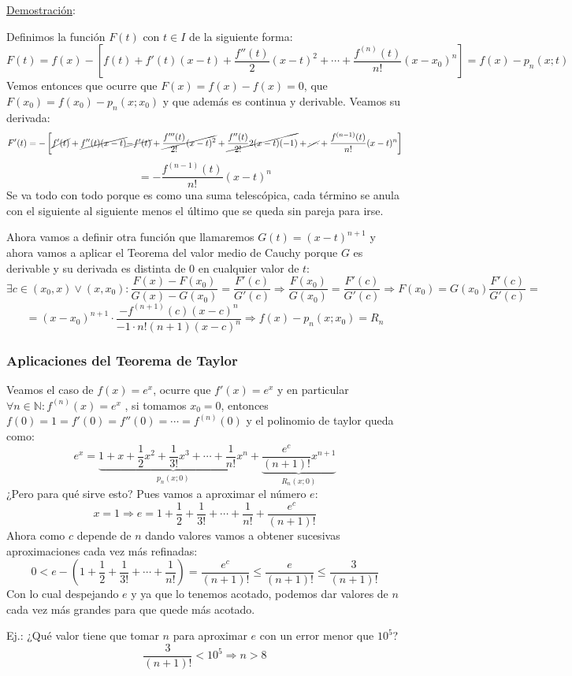 \documentclass[10pt,a4paper,openright]{book}
\begin{document}
\underline{Demostración}:

Definimos la función $F(t)$ con $t\in I$ de la siguiente forma:
$$F(t)=f(x)-\left[f(t)+f'(t)(x-t)+\frac{f''(t)}{2}(x-t)^2+\cdots + \frac{f^{(n)}(t)}{n!}(x-x_0)^n\right]=f(x)-p_n(x;t)$$
Vemos entonces que ocurre que $F(x)=f(x)-f(x)=0$, que $F(x_0)=f(x_0)-p_n(x;x_0)$ y que además es continua y derivable. Veamos su derivada:
$$F'(t)=-\left[\cancel{f'(t)}+\cancel{f''(t)(x-t)}\cancel{-f'(t)}+\cancel{\frac{f'''(t)}{2!}(x-t)^2}+\cancel{\frac{f''(t)}{2!}2(x-t)(-1)}+\cancel{\cdots} +  \frac{f^{(n-1)}(t)}{n!}(x-t)^n\right] $$
$$= -\frac{f^{(n-1)}(t)}{n!}(x-t)^n$$
Se va todo con todo porque es como una suma telescópica, cada término se anula con el siguiente al siguiente menos el último que se queda sin pareja para irse.

Ahora vamos a definir otra función que llamaremos $G(t)=(x-t)^{n+1}$ y ahora vamos a aplicar el Teorema del valor medio de Cauchy porque $G$ es derivable y su derivada es distinta de 0 en cualquier valor de $t$:
$$\exists c \in (x_0,x)\vee (x,x_0): \frac{F(x)-F(x_0)}{G(x)-G(x_0)}=\frac{F'(c)}{G'(c)}\Rightarrow \frac{F(x_0)}{G(x_0)}=\frac{F'(c)}{G'(c)}\Rightarrow F(x_0)=G(x_0)\frac{F'(c)}{G'(c)}=$$
$$=(x-x_0)^{n+1}\cdot \frac{-f^{(n+1)}(c)(x-c)^n}{-1\cdot n!(n+1)(x-c)^n}\Rightarrow f(x)-p_n(x;x_0)=R_n$$


\subsubsection*{Aplicaciones del Teorema de Taylor}
Veamos el caso de $f(x)=e^x$, ocurre que $f'(x)=e^x$ y en particular $\forall n\in \mathbb N : f^{(n)}(x)=e^x$ , si tomamos $x_0=0$, entonces $f(0)=1=f'(0)=f''(0)=\cdots = f^{(n)}(0)$ y el polinomio de taylor queda como:
$$e^x=\underbrace{1+x+\frac{1}{2}x^2+\frac{1}{3!}x^3+\cdots + \frac{1}{n!}x^n}_{p_n(x;0)}+\underbrace{\frac{e^c}{(n+1)!}x^{n+1}}_{R_n(x;0)}$$
¿Pero para qué sirve esto? Pues vamos a aproximar el número $e$:
$$x=1\Rightarrow e=1+\frac{1}{2}+\frac{1}{3!}+\cdots + \frac{1}{n!}+\frac{e^c}{(n+1)!}$$
Ahora como $c$ depende de $n$ dando valores vamos a obtener sucesivas aproximaciones cada vez más refinadas:
$$0< e-(1+\frac{1}{2}+\frac{1}{3!}+\cdots + \frac{1}{n!})=\frac{e^c}{(n+1)!}\leq \frac{e}{(n+1)!}\leq \frac{3}{(n+1)!}$$
Con lo cual despejando $e$ y ya que lo tenemos acotado, podemos dar valores de $n$ cada vez más grandes para que quede más acotado.

Ej.: ¿Qué valor tiene que tomar $n$ para aproximar $e$ con un error menor que $10^5$?
$$\frac{3}{(n+1)!}<10^5\Rightarrow n>8$$
\end{document}
